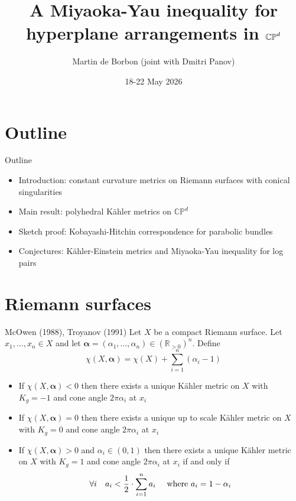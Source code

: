 \documentclass{beamer}
\title[]{A Miyaoka-Yau inequality for hyperplane arrangements in \(\CP^d\)}
\author[Martin de Borbon]{Martin de Borbon (joint with Dmitri Panov)}
\institute[Loughborough]{Living on the edge of the moduli space, Aarhus}
\date{18-22 May 2026}
\newcommand{\R}{\mathbb{R}}
\newcommand{\CP}{\mathbb{CP}}
\begin{document}
\begin{frame}
  \titlepage
\end{frame}

\section{Outline}
\begin{frame}{Outline}
	\begin{itemize}
		\setlength{\itemsep}{\fill}
		\item Introduction: constant curvature metrics on Riemann surfaces with conical singularities
		
		\item Main result: polyhedral K\"ahler metrics on \(\CP^d\)
		
		
		\item Sketch proof: Kobayashi-Hitchin correspondence for parabolic bundles  
		
		\item Conjectures: K\"ahler-Einstein metrics and Miyaoka-Yau inequality for log pairs
	\end{itemize}
\end{frame}

\section{Riemann surfaces}
\begin{frame}{McOwen (1988), Troyanov (1991)}
	Let \(X\) be a compact Riemann surface. Let \(x_1, \ldots, x_n \in X\) and let \(\bm{\alpha} = (\alpha_1, \ldots, \alpha_n) \in (\R_{>0})^n\). Define
	\[
	\chi(X, \bm{\alpha}) = \chi(X) + \sum_{i=1}^{n} (\alpha_i - 1)
	\]
	\begin{itemize}
		\item If \(\chi(X, \bm{\alpha}) < 0\) then there exists a unique  K\"ahler metric on \(X\) with \(K_g = -1\) and cone angle \(2\pi\alpha_i\) at \(x_i\)
		\item If \(\chi(X, \bm{\alpha}) =0\) then there exists a unique up to scale  K\"ahler metric on \(X\) with \(K_g = 0\) and cone angle \(2\pi\alpha_i\) at \(x_i\)
		\item If \(\chi(X, \bm{\alpha}) > 0\) and \(\alpha_i \in (0,1)\) then there exists a unique  K\"ahler metric on \(X\) with \(K_g = 1\) and cone angle \(2\pi\alpha_i\) at \(x_i\) if and only if
		\[
		\forall i \quad
		a_i < \frac{1}{2} \cdot \sum_{i=1}^{n} a_i  \quad \textup{ where } a_i = 1-\alpha_i
		\]
	\end{itemize}
\end{frame}
\end{document}
